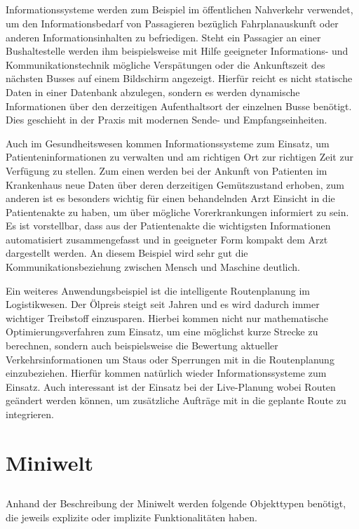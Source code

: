 \documentclass[ngerman]{gdb-aufgabenblatt}
\begin{document}
	\subsection{} %
	Informationssysteme werden zum Beispiel im öffentlichen Nahverkehr verwendet, um den Informationsbedarf von Passagieren bezüglich Fahrplanauskunft oder anderen Informationsinhalten zu befriedigen. Steht ein Passagier an einer Bushaltestelle werden ihm beispielsweise mit Hilfe geeigneter Informations- und Kommunikationstechnik mögliche Verspätungen oder die Ankunftszeit des nächsten Busses auf einem Bildschirm angezeigt. Hierfür reicht es nicht statische Daten in einer Datenbank abzulegen, sondern es werden dynamische Informationen über den derzeitigen Aufenthaltsort der einzelnen Busse benötigt. Dies geschieht in der Praxis mit modernen Sende- und Empfangseinheiten.   
	
	 Auch im Gesundheitswesen kommen Informationssysteme zum Einsatz, um Patienteninformationen zu verwalten und am richtigen Ort zur richtigen Zeit zur Verfügung zu stellen. Zum einen werden bei der Ankunft von Patienten im Krankenhaus neue Daten über deren derzeitigen Gemütszustand erhoben, zum anderen ist es besonders wichtig für einen behandelnden Arzt Einsicht in die Patientenakte zu haben, um über mögliche Vorerkrankungen informiert zu sein. 
	 Es ist vorstellbar, dass aus der Patientenakte die wichtigsten Informationen automatisiert zusammengefasst und in geeigneter Form kompakt dem Arzt dargestellt werden. An diesem Beispiel wird sehr gut die Kommunikationsbeziehung zwischen Mensch und Maschine deutlich. 
	 
	 Ein weiteres Anwendungsbeispiel ist die intelligente Routenplanung im Logistikwesen. Der Ölpreis steigt seit Jahren und es wird dadurch immer wichtiger Treibstoff einzusparen. Hierbei kommen nicht nur mathematische Optimierungsverfahren zum Einsatz, um eine möglichst kurze Strecke zu berechnen, sondern auch beispielsweise die Bewertung aktueller Verkehrsinformationen um Staus oder Sperrungen mit in die Routenplanung einzubeziehen. Hierfür kommen natürlich wieder Informationssysteme zum Einsatz. Auch interessant ist der Einsatz bei der Live-Planung wobei Routen geändert werden können, um zusätzliche Aufträge mit in die geplante Route zu integrieren.
\section{Miniwelt}
	\subsection{} %
		Anhand der Beschreibung der Miniwelt werden folgende Objekttypen benötigt, die jeweils explizite oder implizite Funktionalitäten haben.
		
\end{document}
